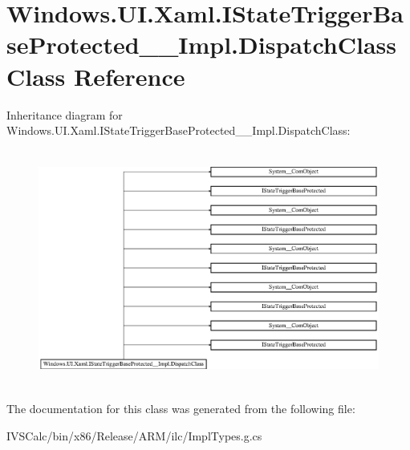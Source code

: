 \hypertarget{class_windows_1_1_u_i_1_1_xaml_1_1_i_state_trigger_base_protected_____impl_1_1_dispatch_class}{}\section{Windows.\+U\+I.\+Xaml.\+I\+State\+Trigger\+Base\+Protected\+\_\+\+\_\+\+Impl.\+Dispatch\+Class Class Reference}
\label{class_windows_1_1_u_i_1_1_xaml_1_1_i_state_trigger_base_protected_____impl_1_1_dispatch_class}
Inheritance diagram for Windows.\+U\+I.\+Xaml.\+I\+State\+Trigger\+Base\+Protected\+\_\+\+\_\+\+Impl.\+Dispatch\+Class\+:\begin{figure}[H]
\begin{center}
\leavevmode
\includegraphics[height=7.797468cm]{class_windows_1_1_u_i_1_1_xaml_1_1_i_state_trigger_base_protected_____impl_1_1_dispatch_class}
\end{center}
\end{figure}


The documentation for this class was generated from the following file\+:\begin{DoxyCompactItemize}
\item 
I\+V\+S\+Calc/bin/x86/\+Release/\+A\+R\+M/ilc/Impl\+Types.\+g.\+cs\end{DoxyCompactItemize}

